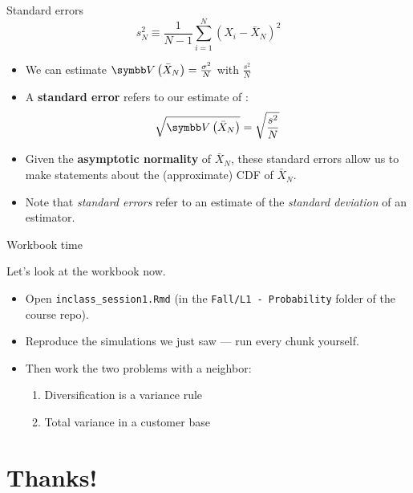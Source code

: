 \documentclass[aspectratio=169,11pt]{beamer}
\begin{document}
\begin{frame}{Standard errors}
\[
s_N^2 \equiv \frac{1}{N-1}\sum_{i=1}^{N} \left(X_i - \bar{X}_N \right)^2
\]
\begin{itemize}
	\item We can estimate $\Var\left(\bar{X}_N\right)=\frac{\sigma^2}{N}$ with $\frac{s^2}{N}$


	\item A {\bf standard error} refers to our estimate of :
	\begin{align*}
	\sqrt{\Var\left( \bar{X}_N \right)} = \sqrt{\frac{s^2}{N}}
\end{align*}

	\item Given the {\bf asymptotic normality} of $\bar{X}_N$, these standard errors allow us to
			make statements about the (approximate) CDF of $\bar{X}_N$.
	

	\item Note that \emph{standard errors} refer to an estimate of the \emph{standard deviation}
			of an estimator.
\end{itemize}
\end{frame}


\begin{frame}{Workbook time}
\begin{center}
{\LARGE \alert{Let's look at the workbook now.}}
\end{center}
\bigskip
\begin{itemize}
	\item Open \texttt{inclass\_session1.Rmd} (in the \texttt{Fall/L1 - Probability} folder of the course repo).
	\item Reproduce the simulations we just saw --- run every chunk yourself.
	\item Then work the two problems with a neighbor:
	\begin{enumerate}
		\item Diversification is a variance rule
		\item Total variance in a customer base
	\end{enumerate}
\end{itemize}
\end{frame}


\section{Thanks!}
\end{document}
